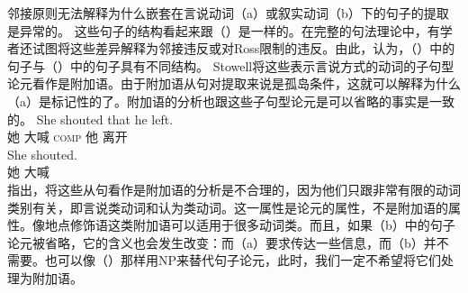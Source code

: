 邻接原则无法解释为什么嵌套在言说动词（a）或叙实动词（b）下的句子的提取是异常的\citep[--69]{EL79a}。
\eal
{}
\zl
这些句子的结构看起来跟（）是一样的。在完整的句法理论中，有学者还试图将这些差异解释为邻接违反或对Ross限制的违反。由此，\citet[--402]{Stowell81a-u}认为，（）中的句子与（）中的句子具有不同结构。
Stowell将这些表示言说方式的动词的子句型论元看作是附加语。由于附加语从句对提取来说是孤岛条件，这就可以解释为什么（a）是标记性的了。附加语的分析也跟这些子句型论元是可以省略的事实是一致的。
\eal
\ex 
\gll She shouted that he left.\\
她 大喊 \textsc{comp} 他 离开\\
\ex 
\gll She shouted.\\
她 大喊\\
\zl
 \citet[]{AG2008a}指出，将这些从句看作是附加语的分析是不合理的，因为他们只跟非常有限的动词类别有关，即言说类动词和认为类动词。这一属性是论元的属性，不是附加语的属性。像地点修饰语这类附加语可以适用于很多动词类。而且，如果（b）中的句子论元被省略，它的含义也会发生改变：而（a）要求传达一些信息，而（b）并不需要。也可以像（）那样用NP来替代句子论元，此时，我们一定不希望将它们处理为附加语。
